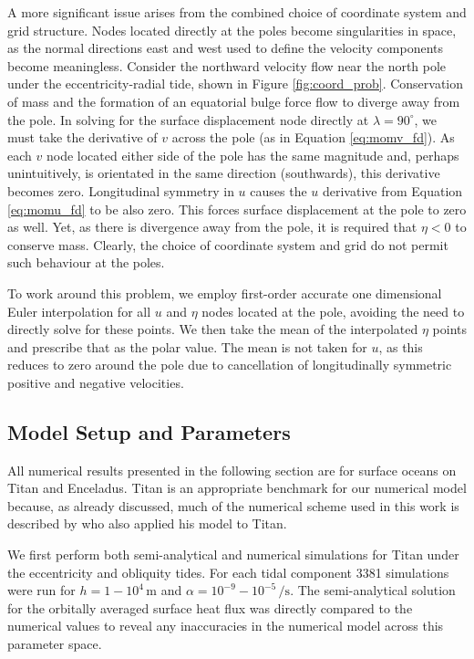 A more significant issue arises from the combined choice of coordinate system and grid structure. Nodes located directly at the poles become singularities in space, as the normal directions east and west used to define the velocity components become meaningless. Consider the northward velocity flow near the north pole under the eccentricity-radial tide, shown in Figure \ref{fig:coord_prob}. Conservation of mass and the formation of an equatorial bulge force flow to diverge away from the pole. In solving for the surface displacement node directly at $\lambda = 90^{\circ}$, we must take the derivative of $v$ across the pole (as in Equation \ref{eq:momv_fd}). As each $v$ node located either side of the pole has the same magnitude and, perhaps unintuitively, is orientated in the same direction (southwards), this derivative becomes zero. Longitudinal symmetry in $u$ causes the $u$ derivative from Equation \ref{eq:momu_fd} to be also zero. This forces surface displacement at the pole to zero as well. Yet, as there is divergence away from the pole, it is required that $\eta < 0$ to conserve mass. Clearly, the choice of coordinate system and grid do not permit such behaviour at the poles. 

To work around this problem, we employ first-order accurate one dimensional Euler interpolation for all $u$ and $\eta$ nodes located at the pole, avoiding the need to directly solve for these points. We then take the mean of the interpolated $\eta$ points and prescribe that as the polar value. The mean is not taken for $u$, as this reduces to zero around the pole due to cancellation of longitudinally symmetric positive and negative velocities.

\subsection{Model Setup and Parameters \label{subsec:param}}



All numerical results presented in the following section are for surface oceans on Titan and Enceladus. Titan is an appropriate benchmark for our numerical model because, as already discussed, much of the numerical scheme used in this work is described by \citet{sears1995tidal} who also applied his model to Titan.

We first perform both semi-analytical and numerical simulations for Titan under the eccentricity and obliquity tides. For each tidal component 3381 simulations were run for \hbox{$h = 1 - 10^4 \, \si{\metre}$} and \hbox{$\alpha = 10^{-9} - 10^{-5} \, \si{\per\second}$}. The semi-analytical solution for the orbitally averaged surface heat flux was directly compared to the numerical values to reveal any inaccuracies in the numerical model across this parameter space. 

